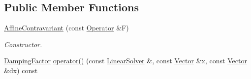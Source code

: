 \subsection*{Public Member Functions}
\begin{DoxyCompactItemize}
\item 
\hypertarget{classSpacy_1_1Newton_1_1Damping_1_1AffineContravariant_a9b7e17fd2999d35cc7fac08bb887da74}{}\hyperlink{classSpacy_1_1Newton_1_1Damping_1_1AffineContravariant_a9b7e17fd2999d35cc7fac08bb887da74}{Affine\+Contravariant} (const \hyperlink{group__SpacyGroup_ga3f89622eba80cf840b2a7102f1303455_ga3f89622eba80cf840b2a7102f1303455}{Operator} \&F)\label{classSpacy_1_1Newton_1_1Damping_1_1AffineContravariant_a9b7e17fd2999d35cc7fac08bb887da74}

\begin{DoxyCompactList}\small\item\em Constructor. \end{DoxyCompactList}\item 
\hypertarget{classSpacy_1_1Newton_1_1Damping_1_1AffineContravariant_a9b4a51d80b5ae574d91200d0867a55cd}{}\hyperlink{classSpacy_1_1DampingFactor}{Damping\+Factor} \hyperlink{classSpacy_1_1Newton_1_1Damping_1_1AffineContravariant_a9b4a51d80b5ae574d91200d0867a55cd}{operator()} (const \hyperlink{namespaceSpacy_a7d5cd1c6fb9dd85aa345b536caf30bba_a7d5cd1c6fb9dd85aa345b536caf30bba}{Linear\+Solver} \&, const \hyperlink{classSpacy_1_1Vector}{Vector} \&x, const \hyperlink{classSpacy_1_1Vector}{Vector} \&dx) const \label{classSpacy_1_1Newton_1_1Damping_1_1AffineContravariant_a9b4a51d80b5ae574d91200d0867a55cd}


\end{DoxyCompactItemize}
